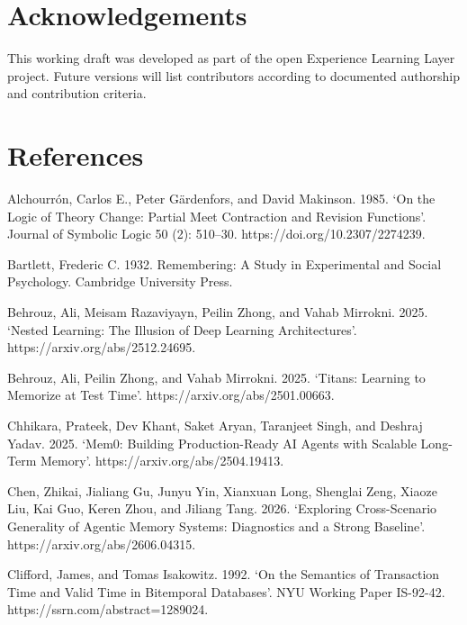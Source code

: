 \documentclass[
  english,
  a4paper,
  DIV=11,
  numbers=noendperiod]{scrreprt}
\begin{document}

\chapter*{Acknowledgements}\label{acknowledgements}


This working draft was developed as part of the open Experience Learning
Layer project. Future versions will list contributors according to
documented authorship and contribution criteria.


\chapter*{References}\label{references}


Alchourrón, Carlos E., Peter Gärdenfors, and David Makinson. 1985. `On
the Logic of Theory Change: Partial Meet Contraction and Revision
Functions'. Journal of Symbolic Logic 50 (2): 510--30.
https://doi.org/10.2307/2274239.

Bartlett, Frederic C. 1932. Remembering: A Study in Experimental and
Social Psychology. Cambridge University Press.

Behrouz, Ali, Meisam Razaviyayn, Peilin Zhong, and Vahab Mirrokni. 2025.
`Nested Learning: The Illusion of Deep Learning Architectures'.
https://arxiv.org/abs/2512.24695.

Behrouz, Ali, Peilin Zhong, and Vahab Mirrokni. 2025. `Titans: Learning
to Memorize at Test Time'. https://arxiv.org/abs/2501.00663.

Chhikara, Prateek, Dev Khant, Saket Aryan, Taranjeet Singh, and Deshraj
Yadav. 2025. `Mem0: Building Production-Ready AI Agents with Scalable
Long-Term Memory'. https://arxiv.org/abs/2504.19413.

Chen, Zhikai, Jialiang Gu, Junyu Yin, Xianxuan Long, Shenglai Zeng,
Xiaoze Liu, Kai Guo, Keren Zhou, and Jiliang Tang. 2026. `Exploring
Cross-Scenario Generality of Agentic Memory Systems: Diagnostics and a
Strong Baseline'. https://arxiv.org/abs/2606.04315.

Clifford, James, and Tomas Isakowitz. 1992. `On the Semantics of
Transaction Time and Valid Time in Bitemporal Databases'. NYU Working
Paper IS-92-42. https://ssrn.com/abstract=1289024.
\end{document}
